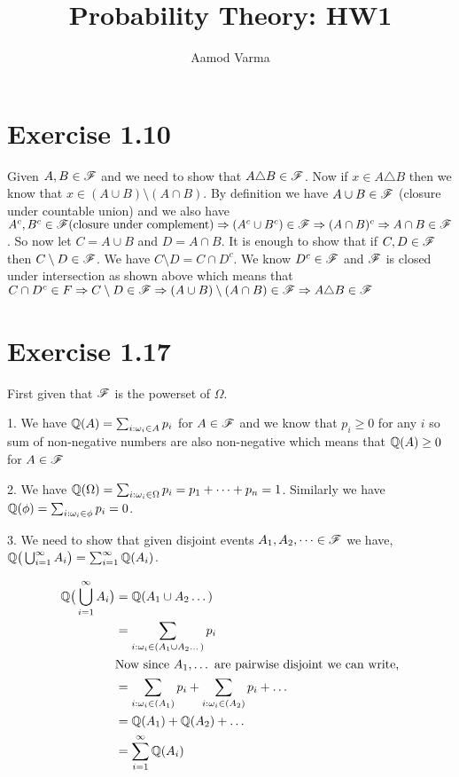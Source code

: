 \documentclass[a4paper]{report}
\title{Probability Theory: HW1}
\author{Aamod Varma}
\begin{document}
\maketitle
\date{}


\section*{Exercise 1.10}
Given $A, B \in \mathscr{F}$ and we need to show that  $A \triangle B \in \mathscr{F}$. Now  if  $x \in A \triangle B$ then we know that  $x \in (A \cup B) \setminus (A \cap B)$. By definition we have  $A \cup B \in \mathscr{F}$ (closure under countable union) and we also have  $A^{c}, B^{c} \in \mathscr{F} \text{(closure under complement)} \Rightarrow (A^{c} \cup B^{c}) \in \mathscr{F} \Rightarrow (A \cap B)^{c} \Rightarrow A \cap B \in \mathscr{F}  $. So now let $C = A \cup B$ and  $D = A \cap B$. It is enough to show that if $C,D \in \mathscr{F}$ then  $C \setminus D \in \mathscr{F}$. We have  $C \setminus D = C \cap D^{c}$. We know $D^{c} \in \mathscr{F}$ and $\mathscr{F}$ is closed under intersection as shown above which means that  $C \cap D^{c} \in F \Rightarrow C \setminus D \in \mathscr{F} \Rightarrow (A \cup B) \setminus (A \cap B) \in \mathscr{F} \Rightarrow A \triangle B \in \mathscr{F} $

\section*{Exercise 1.17}

First given that $\mathscr{F}$ is the powerset of  $\Omega$. 

1. We have $\mathbb{Q}(A) = \sum_{i: \omega_i \in A} p_i$ for  $A \in \mathscr{F}$ and we know that  $p_i \ge 0$ for any  $i$ so sum of non-negative numbers are also non-negative which means that  $\mathbb{Q}(A) \ge 0$ for $A \in \mathscr{F}$

2. We have $\mathbb{Q}(\Omega) = \sum_{i: \omega_i \in \Omega} p_i = p_1 + \dots + p_n = 1$. Similarly we have $\mathbb{Q}(\phi) = \sum_{i: \omega_i \in \phi} p_i = 0$.

3. We need to show that given disjoint events  $A_1, A_2, \dots \in \mathscr{F}$ we have, $\mathbb{Q}\big ( \bigcup_{i = 1}^{\infty} A_i \big) = \sum_{i = 1}^{\infty} \mathbb{Q}(A_i)$.

\begin{align*}
    \mathbb{Q}\big ( \bigcup_{i = 1}^{\infty} A_i \big)  &= \mathbb{Q}(A_1 \cup A_2 \dots ) \\ &= \sum_{i: \omega_i \in (A_1 \cup A_2 \dots)} p_i \\
                                            &\text{Now since $A_1,\dots$ are pairwise disjoint we can write,}\\
                                            &=  \sum_{i: \omega_i \in (A_1)} p_i   + \sum_{i: \omega_i \in (A_2)} p_i  + \dots\\
                                            &= \mathbb{Q}(A_1) + \mathbb{Q}(A_2)  + \dots \\
                                            &= \sum_{i = 1}^{\infty} \mathbb{Q}(A_i)
\end{align*}
\end{document}
